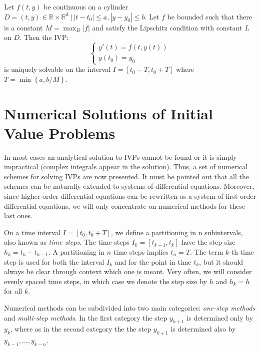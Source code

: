 \begin{theorem}
	Let $f(t,y)$ be continuous on a cylinder $D = {(t,y) \in \mathbb{R} \times \mathbb{R}^d ~ \big| ~ |t-t_0| \leq a, |y-y_0| \leq b}$. Let $f$ be bounded such that there is a constant $M = \max_{D} |f|$ and satisfy the Lipschitz condition with constant $L$ on $D$. Then the IVP:
	\begin{equation}
	\begin{cases}
		y'(t) = f(t,y(t)) \\
		y(t_0) = y_0
	\end{cases}
	\end{equation}
	is uniquely solvable on the interval $I = [t_0-T, t_0+T]$ where $T = \min\left\lbrace a, b/M \right\rbrace$.
\end{theorem}

\section{Numerical Solutions of Initial Value Problems}

In most cases an analytical solution to IVPs cannot be found or it is simply impractical (complex integrals appear in the solution). Thus, a set of numerical schemes for solving IVPs are now presented. It must be pointed out that all the schemes can be naturally extended to systems of differential equations. Moreover, since higher order differential equations can be rewritten as a system of first order differential equations, we will only concentrate on numerical methods for these last ones.

\begin{definition}
On a time interval $I = [t_0,t_0+T]$, we define a partitioning in n subintervals, also known as \textit{time steps}. The time steps $I_k=[t_{k-1}, t_k]$ have the step size $h_k = t_k - t_{k-1}$. A partitioning in $n$ time steps implies $t_n = T$. The term $k$-th time step is used for both the interval $I_k$ and for the point in time $t_k$, but it should always be clear through context which one is meant. Very often, we will consider evenly spaced time steps, in which case we denote the step size by $h$ and $h_k = h$ for all $k$.
\end{definition}

Numerical methods can be subdivided into two main categories: \textit{one-step methods} and \textit{multi-step methods}. In the first category the step $y_{k+1}$ is determined only by $y_{k}$, where as in the second category the the step $y_{k+1}$ is determined also by $y_{k-1},\dots,y_{k-n}$.

